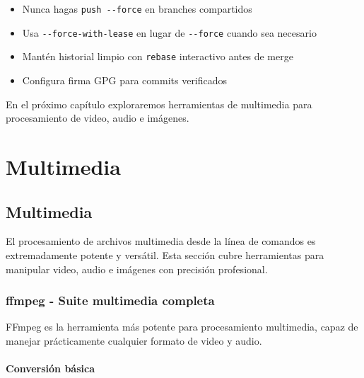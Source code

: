 \documentclass[
  11pt,
  letterpaper,
  oneside,
  openany]{scrbook}
\providecommand{\tightlist}{%
  \setlength{\itemsep}{0pt}\setlength{\parskip}{0pt}}
\begin{document}
\begin{tcolorbox}[enhanced jigsaw, coltitle=black, breakable, arc=.35mm, toprule=.15mm, colbacktitle=quarto-callout-important-color!10!white, colframe=quarto-callout-important-color-frame, opacityback=0, colback=white, bottomtitle=1mm, bottomrule=.15mm, rightrule=.15mm, left=2mm, toptitle=1mm, leftrule=.75mm, title=\textcolor{quarto-callout-important-color}{\faExclamation}\hspace{0.5em}{Mejores prácticas}, titlerule=0mm, opacitybacktitle=0.6]

\begin{itemize}
\tightlist
\item
  Nunca hagas \texttt{push\ -\/-force} en branches compartidos
\item
  Usa \texttt{-\/-force-with-lease} en lugar de \texttt{-\/-force}
  cuando sea necesario
\item
  Mantén historial limpio con \texttt{rebase} interactivo antes de merge
\item
  Configura firma GPG para commits verificados
\end{itemize}

\end{tcolorbox}

En el próximo capítulo exploraremos herramientas de multimedia para
procesamiento de video, audio e imágenes.

\part{Multimedia}

\chapter{Multimedia}\label{multimedia-2}

El procesamiento de archivos multimedia desde la línea de comandos es
extremadamente potente y versátil. Esta sección cubre herramientas para
manipular video, audio e imágenes con precisión profesional.

\section{ffmpeg - Suite multimedia completa}\label{sec-ffmpeg}

FFmpeg es la herramienta más potente para procesamiento multimedia,
capaz de manejar prácticamente cualquier formato de video y audio.

\subsection{Conversión básica}\label{conversiuxf3n-buxe1sica}
\end{document}
